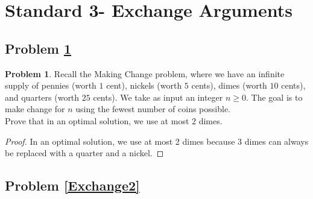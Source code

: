\documentclass[11pt]{article}
\theoremstyle{definition}
\theoremstyle{definition}
\newtheorem{required}{Problem}
\theoremstyle{definition}
\begin{document}
\section{Standard 3- Exchange Arguments}
\subsection{Problem \ref{Exchange1}}
\begin{required} \label{Exchange1}
Recall the Making Change problem, where we have an infinite supply of pennies (worth $1$ cent), nickels (worth $5$ cents), dimes (worth $10$ cents), and quarters (worth $25$ cents). We take as input an integer $n \geq 0$. The goal is to make change for $n$ using the fewest number of coins possible. \\

\noindent Prove that in an optimal solution, we use at most $2$ dimes. 
\end{required}

\begin{proof}
In an optimal solution, we use at most 2 dimes because 3 dimes can always be replaced with a quarter and a nickel. 
\end{proof}



\newpage
\subsection{Problem \ref{Exchange2}}
\end{document}
